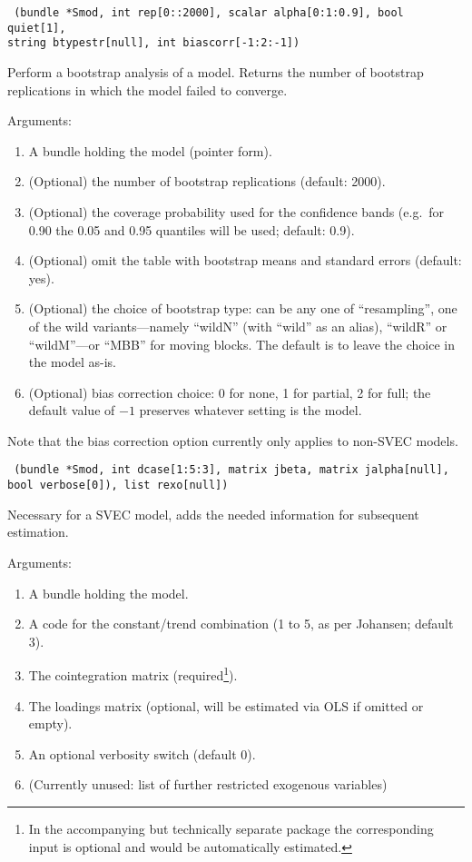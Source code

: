 \documentclass[a4paper,10pt]{article}
\newenvironment{funcdoc}[1]
{\noindent\hrulefill\newline\nopagebreak\texttt{#1}%
\nopagebreak\par\noindent\hrulefill%
\nopagebreak\par\nopagebreak\smallskip\nopagebreak\par}
{\bigskip}
\newcommand{\dtk}[1]{\texttt{\detokenize{#1}}}
\begin{document}
\begin{funcdoc}{ (bundle *Smod, int rep[0::2000], scalar alpha[0:1:0.9], bool
    quiet[1],\\
    string btypestr[null], int biascorr[-1:2:-1])}
    \noindent Perform a bootstrap analysis of a model. Returns the number of
  bootstrap replications in which the model failed to converge. 
  
  \noindent Arguments:
  
  \begin{enumerate}
  \item A bundle holding the model (pointer form).
  \item (Optional) the number of bootstrap replications (default: 2000).
  \item (Optional) the coverage probability used for the confidence bands (e.g.\ 
    for 0.90 the 0.05 and 0.95 quantiles will be used; default: 0.9).
  \item (Optional) omit the table with bootstrap means and standard
    errors (default: yes).
  \item (Optional) the choice of bootstrap type: can be any one of
    ``resampling'', one of the wild variants---namely ``wildN'' (with
    ``wild'' as an alias), ``wildR'' or ``wildM''---or ``MBB'' for
    moving blocks. The default is to leave the choice in the model
    as-is.
  \item (Optional) bias correction choice: 0 for none, 1 for partial,
    2 for full; the default value of $-1$ preserves whatever setting
    is the model.
  \end{enumerate}
  Note that the bias correction option currently only applies to
  non-SVEC models.
\end{funcdoc}

\begin{funcdoc}{ (bundle *Smod, int dcase[1:5:3],
			   matrix jbeta, matrix jalpha[null],\\
			   bool verbose[0]), list rexo[null])}
  \noindent Necessary for a SVEC model, adds the needed information 
  for subsequent estimation. 
  
  \noindent Arguments:
  \begin{enumerate}
  \item A bundle holding the model.
  \item A code for the constant/trend combination (1 to 5, as per
    Johansen; default 3).
  \item The cointegration matrix (required\footnote{In the accompanying but 
  technically separate package \dtk{SVEC_GUI} the corresponding input is optional and
  would be automatically estimated.}).
  \item The loadings matrix (optional, will be estimated via OLS if
    omitted or empty).
  \item An optional verbosity switch (default 0).
  \item (Currently unused: list of further restricted exogenous
    variables)
  \end{enumerate}
\end{funcdoc}
\end{document}
